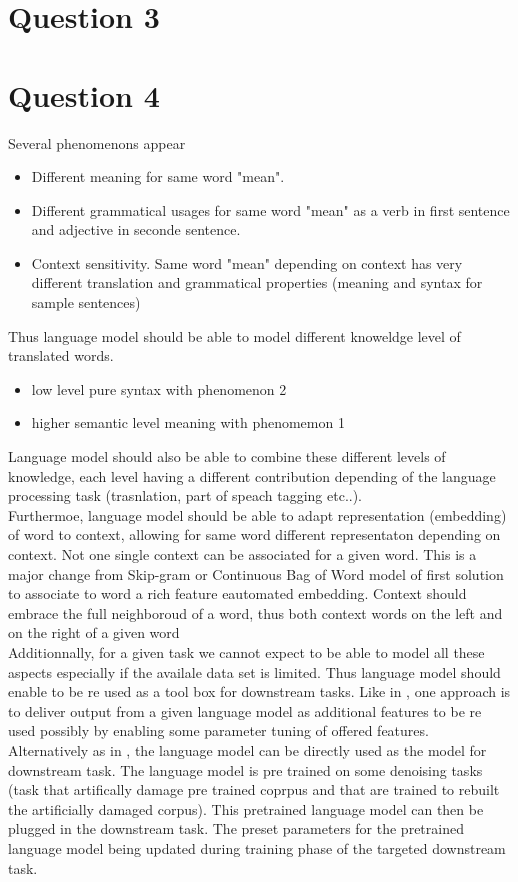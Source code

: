 \documentclass[a4paper]{article}
\begin{document}
\section{Question 3}

\section{Question 4}
Several phenomenons appear
\begin{itemize}
\item Different meaning for same word "mean".
\item Different grammatical usages for same word "mean" as a verb in first sentence and adjective in seconde sentence.
\item Context sensitivity. Same word "mean" depending on context has very different translation and grammatical properties (meaning and syntax for sample sentences)
\end{itemize}


Thus language model should be able to model different knoweldge level of translated words. 
\begin{itemize}
\item low level pure syntax with phenomenon 2
\item higher semantic level meaning with phenomemon 1
\end{itemize}

Language model should also be able to combine these different levels of knowledge, each level having a different contribution depending of  the language processing task (trasnlation, part of speach tagging etc..).\\

Furthermoe, language model should be able to adapt representation (embedding) of word to context, allowing for same word different representaton depending on context. Not one single context can be associated for a given word. This is a major change from Skip-gram or Continuous Bag of Word model of \cite{quocLe2014doc2vec} first solution to associate to word a rich feature eautomated embedding. Context should embrace the full neighboroud of a word, thus both context words on the left and on the right of a given word\\

Additionnally, for a given task we cannot expect to be able to model all these aspects especially if the availale data set is limited. Thus language model should enable to be re used as a tool box for downstream tasks. Like in \cite{elmo2018}, one approach is to deliver output from a given language model as additional features to be re used possibly by enabling some parameter tuning of offered features. Alternatively as in \cite{bert2018}, the language model can be directly used as the model for downstream task. The language model is pre trained on some denoising tasks (task that artifically damage pre trained coprpus and that are trained to rebuilt the artificially damaged corpus). This pretrained language model can then be plugged in the downstream task. The preset parameters for the pretrained language model being updated during training phase of  the targeted downstream task.




\end{document}
